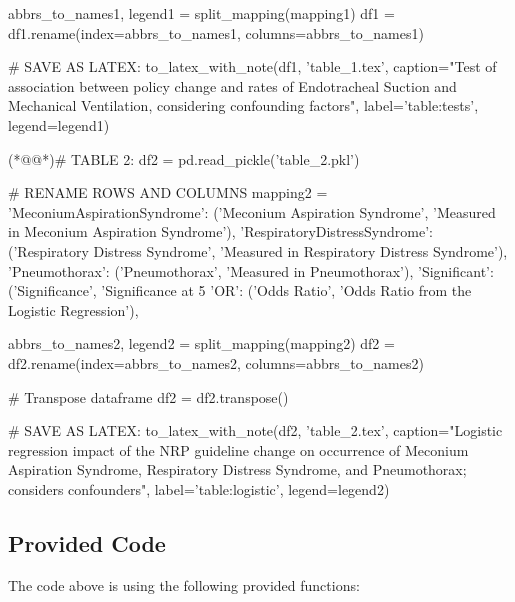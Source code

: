 \documentclass[11pt]{article}
\begin{document}
\begin{python}
abbrs_to_names1, legend1 = split_mapping(mapping1)
df1 = df1.rename(index=abbrs_to_names1, columns=abbrs_to_names1)

# SAVE AS LATEX:
to_latex_with_note(df1, 
                   'table_1.tex', 
                   caption="Test of association between policy change and rates of Endotracheal Suction and Mechanical Ventilation, considering confounding factors", 
                   label='table:tests',
                   legend=legend1)

(*@@*)# TABLE 2:
df2 = pd.read_pickle('table_2.pkl')

# RENAME ROWS AND COLUMNS
mapping2 = {
    'MeconiumAspirationSyndrome': ('Meconium Aspiration Syndrome', 'Measured in Meconium Aspiration Syndrome'),
    'RespiratoryDistressSyndrome': ('Respiratory Distress Syndrome', 'Measured in Respiratory Distress Syndrome'),
    'Pneumothorax': ('Pneumothorax', 'Measured in Pneumothorax'),
    'Significant': ('Significance', 'Significance at 5%
    'OR': ('Odds Ratio', 'Odds Ratio from the Logistic Regression'),
}

abbrs_to_names2, legend2 = split_mapping(mapping2)
df2 = df2.rename(index=abbrs_to_names2, columns=abbrs_to_names2)

# Transpose dataframe
df2 = df2.transpose()

# SAVE AS LATEX:
to_latex_with_note(df2, 
                   'table_2.tex', 
                   caption="Logistic regression impact of the NRP guideline change on occurrence of Meconium Aspiration Syndrome, Respiratory Distress Syndrome, and Pneumothorax; considers confounders", 
                   label='table:logistic',
                   legend=legend2)

\end{python}

\subsection{Provided Code}
The code above is using the following provided functions:
\end{document}
